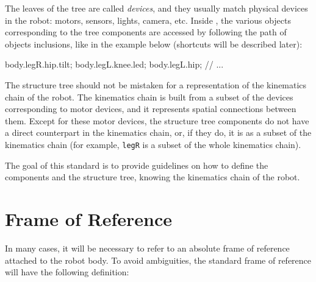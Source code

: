The leaves of the tree are called
\textit{devices}, and they usually match physical
devices in the robot: motors, sensors, lights, camera, etc. Inside
\urbi, the various objects corresponding to the tree components are
accessed by following the path of objects inclusions, like in the
example below (shortcuts will be described later):

\begin{urbifixme}
body.legR.hip.tilt;
body.legL.knee.led;
body.legL.hip;
// ...
\end{urbifixme}


The structure tree should not be mistaken for a representation of the
kinematics chain of the robot. The kinematics chain is built from a
subset of the devices corresponding to motor devices, and it represents
spatial connections between them. Except for these motor devices, the
structure tree components do not have a direct counterpart in the
kinematics chain, or, if they do, it is as a subset of the kinematics
chain (for example, \texttt{legR} is a subset of the whole kinematics
chain).


The goal of this standard is to provide guidelines on how to define the
components and the structure tree, knowing the kinematics chain of the
robot.

\section{Frame of Reference}

In many cases, it will be necessary to refer to an absolute frame of
reference attached to the robot body. To avoid ambiguities, the
standard frame of reference will have the following definition:

